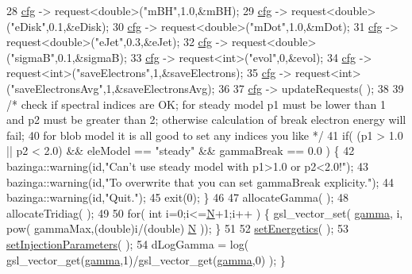 \begin{DoxyCode}
28   \hyperlink{classbaseClass_a744f87a6ebe63da08256c022d42a4ca7}{cfg} -> request<double>(\textcolor{stringliteral}{"mBH"},1.0,&mBH);
29   \hyperlink{classbaseClass_a744f87a6ebe63da08256c022d42a4ca7}{cfg} -> request<double>(\textcolor{stringliteral}{"eDisk"},0.1,&eDisk);
30   \hyperlink{classbaseClass_a744f87a6ebe63da08256c022d42a4ca7}{cfg} -> request<double>(\textcolor{stringliteral}{"mDot"},1.0,&mDot);
31   \hyperlink{classbaseClass_a744f87a6ebe63da08256c022d42a4ca7}{cfg} -> request<double>(\textcolor{stringliteral}{"eJet"},0.3,&eJet);
32   \hyperlink{classbaseClass_a744f87a6ebe63da08256c022d42a4ca7}{cfg} -> request<double>(\textcolor{stringliteral}{"sigmaB"},0.1,&sigmaB);
33   \hyperlink{classbaseClass_a744f87a6ebe63da08256c022d42a4ca7}{cfg} -> request<int>(\textcolor{stringliteral}{"evol"},0,&evol);
34   \hyperlink{classbaseClass_a744f87a6ebe63da08256c022d42a4ca7}{cfg} -> request<int>(\textcolor{stringliteral}{"saveElectrons"},1,&saveElectrons);
35   \hyperlink{classbaseClass_a744f87a6ebe63da08256c022d42a4ca7}{cfg} -> request<int>(\textcolor{stringliteral}{"saveElectronsAvg"},1,&saveElectronsAvg);
36 
37   \hyperlink{classbaseClass_a744f87a6ebe63da08256c022d42a4ca7}{cfg} -> updateRequests( );
38 
39   \textcolor{comment}{/* check if spectral indices are OK; for steady model p1 must be lower than 1 and p2 must be greater than
       2; otherwise calculation of break electron energy will fail;}
40 \textcolor{comment}{     for blob model it is all good to set any indices you like */}
41   \textcolor{keywordflow}{if}( (p1 > 1.0 || p2 < 2.0) && eleModel == \textcolor{stringliteral}{"steady"} && gammaBreak == 0.0 ) \{
42     bazinga::warning(\textcolor{keywordtype}{id},\textcolor{stringliteral}{"Can't use steady model with p1>1.0 or p2<2.0!"});
43     bazinga::warning(\textcolor{keywordtype}{id},\textcolor{stringliteral}{"To overwrite that you can set gammaBreak explicity."});
44     bazinga::warning(\textcolor{keywordtype}{id},\textcolor{stringliteral}{"Quit."});
45     exit(0); \}
46 
47   allocateGamma( );
48   allocateTridiag( );
49   
50   \textcolor{keywordflow}{for}( \textcolor{keywordtype}{int} i=0;i<=\hyperlink{classbaseClass_a2b4d07d2b46197d495de0477f4bb22f8}{N}+1;i++ ) \{ gsl\_vector\_set( \hyperlink{classelectrons_aba72b6575be27358efcb13cc3415df68}{gamma}, i, pow( gammaMax,(\textcolor{keywordtype}{double})i/(\textcolor{keywordtype}{double})
      \hyperlink{classbaseClass_a2b4d07d2b46197d495de0477f4bb22f8}{N} )); \}
51 
52   \hyperlink{classelectrons_aac9514f742569f37097d13b3ea04239a}{setEnergetics}( );
53   \hyperlink{classelectrons_ad94a7b6cc694ef0e70f7efaadef8463d}{setInjectionParameters}( );
54   dLogGamma = log( gsl\_vector\_get(\hyperlink{classelectrons_aba72b6575be27358efcb13cc3415df68}{gamma},1)/gsl\_vector\_get(\hyperlink{classelectrons_aba72b6575be27358efcb13cc3415df68}{gamma},0) ); \}
\end{DoxyCode}
